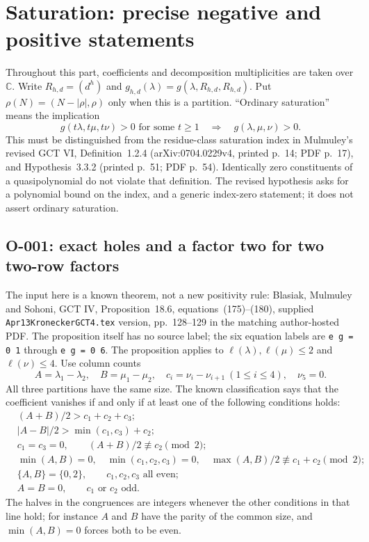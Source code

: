 
\section{Saturation: precise negative and positive statements}

Throughout this part, coefficients and decomposition multiplicities are taken
over $\mathbb C$.  Write $R_{h,d}=(d^h)$ and
$g_{h,d}(\lambda)=g(\lambda,R_{h,d},R_{h,d})$.  Put
$\rho(N)=(N-|\rho|,\rho)$ only when this is a partition.
``Ordinary saturation'' means the implication
\[
 g(t\lambda,t\mu,t\nu)>0\text{ for some }t\geq1
 \quad\Longrightarrow\quad g(\lambda,\mu,\nu)>0.
\]
This must be distinguished from the residue-class saturation index in
Mulmuley's revised GCT VI, Definition~1.2.4 (arXiv:0704.0229v4,
printed p.~14; PDF p.~17), and Hypothesis~3.3.2 (printed p.~51;
PDF p.~54). Identically zero constituents of a quasipolynomial do not
violate that definition.  The revised hypothesis asks for a polynomial
bound on the index, and a generic index-zero statement; it does not assert
ordinary saturation.

\subsection{O-001: exact holes and a factor two for two two-row factors}

The input here is a known theorem, not a new positivity rule: Blasiak,
Mulmuley and Sohoni, GCT IV, Proposition~18.6, equations~(175)--(180),
supplied \texttt{Apr13KroneckerGCT4.tex} version, pp.~128--129 in
the matching author-hosted PDF. The proposition itself has no source
label; the six equation labels are \texttt{e g = 0 1} through
\texttt{e g = 0 6}. The proposition applies to
$\ell(\lambda),\ell(\mu)\leq2$ and $\ell(\nu)\leq4$.
Use column counts
\[
 A=\lambda_1-\lambda_2,\quad B=\mu_1-\mu_2,
 \quad c_i=\nu_i-\nu_{i+1}\ (1\leq i\leq4),\quad\nu_5=0.
\]
All three partitions have the same size.  The known classification says
that the coefficient vanishes if and only if at least one of the following
conditions holds:
\begin{align}
 &(A+B)/2>c_1+c_2+c_3; \tag{O-001.a}\\
 &|A-B|/2>\min(c_1,c_3)+c_2; \tag{O-001.b}\\
 &c_1=c_3=0,\qquad (A+B)/2\not\equiv c_2\pmod2; \tag{O-001.c}\\
 &\min(A,B)=0,\quad \min(c_1,c_2,c_3)=0,
       \quad\max(A,B)/2\not\equiv c_1+c_2\pmod2; \tag{O-001.d}\\
 &\{A,B\}=\{0,2\},\qquad c_1,c_2,c_3\text{ all even};\tag{O-001.e}\\
 &A=B=0,\qquad c_1\text{ or }c_2\text{ odd}. \tag{O-001.f}
\end{align}
The halves in the congruences are integers whenever the other conditions
in that line hold; for instance $A$ and $B$ have the parity of the common
size, and $\min(A,B)=0$ forces both to be even.

